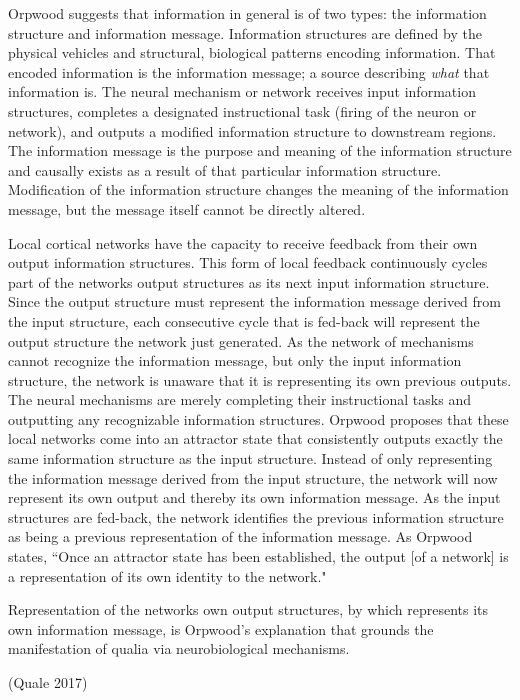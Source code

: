 \begin{myquote}
Orpwood suggests that information in general is of two types: the information structure and information message. Information structures are defined by the physical vehicles and structural, biological patterns encoding information. That encoded information is the information message; a source describing \textsl{what} that information is. The neural mechanism or network receives input information structures, completes a designated instructional task (firing of the neuron or network), and outputs a modified information structure to downstream regions. The information message is the purpose and meaning of the information structure and causally exists as a result of that particular information structure. Modification of the information structure changes the meaning of the information message, but the message itself cannot be directly altered.

Local cortical networks have the capacity to receive feedback from their own output information structures. This form of local feedback continuously cycles part of the networks output structures as its next input information structure. Since the output structure must represent the information message derived from the input structure, each consecutive cycle that is fed-back will represent the output structure the network just generated. As the network of mechanisms cannot recognize the information message, but only the input information structure, the network is unaware that it is representing its own previous outputs. The neural mechanisms are merely completing their instructional tasks and outputting any recognizable information structures. Orpwood proposes that these local networks come into an attractor state that consistently outputs exactly the same information structure as the input structure. Instead of only representing the information message derived from the input structure, the network will now represent its own output and thereby its own information message. As the input structures are fed-back, the network identifies the previous information structure as being a previous representation of the information message. As Orpwood states, “Once an attractor state has been established, the output [of a network] is a representation of its own identity to the network."

Representation of the networks own output structures, by which represents its own information message, is Orpwood's explanation that grounds the manifestation of qualia via neurobiological mechanisms. 

\hfill(Quale 2017)
\end{myquote}

